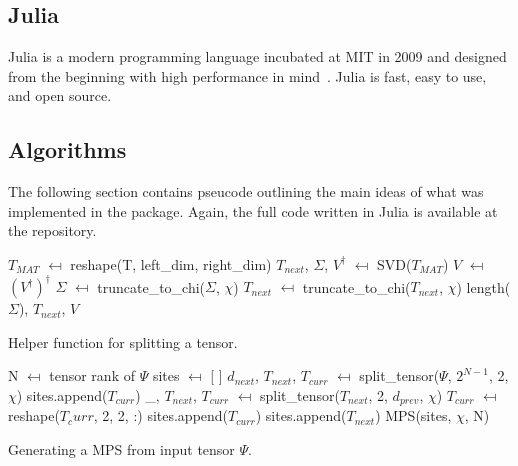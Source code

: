 \documentclass[12pt]{article}
\begin{document}
\begin{multicols}{2}
	\subsection*{Julia}
	Julia is a modern programming language incubated at MIT in 2009 and
	designed from the beginning with high performance in mind~\cite{Julia-lang}.
	Julia is fast, easy to use, and open source.
	\subsection*{Algorithms}
	The following section contains pseucode outlining the main ideas
	of what was implemented in the package. Again, the full code written
	in Julia is available at the repository.
	\begin{algorithm}[H]
		$T_{MAT}$ $\mapsfrom$ reshape(T, left\_dim, right\_dim)\;
		$T_{next}$, $\Sigma$, $V^\dagger$ $\mapsfrom$ SVD($T_{MAT}$)\;
		$V$ $\mapsfrom$ $(V^\dagger)^\dagger$\;
		$\Sigma$ $\mapsfrom$ truncate\_to\_chi($\Sigma$, $\chi$)\;
		$T_{next}$ $\mapsfrom$ truncate\_to\_chi($T_{next}$, $\chi$)\;
		\Return length($\Sigma$), $T_{next}$, $V$\;
		\caption{Helper function for splitting a tensor.}
		\label{split-tensor}
	\end{algorithm}
	\vspace{20px}
	\begin{algorithm}[H]
		N $\mapsfrom$ tensor rank of $\Psi$\;
		sites $\mapsfrom$ [ ]\;
		$d_{next}$, $T_{next}$, $T_{curr}$ $\mapsfrom$ split\_tensor($\Psi$, $2^{N-1}$, 2, $\chi$)\;
		sites.append($T_{curr}$)\;
		\_, $T_{next}$, $T_{curr}$ $\mapsfrom$ split\_tensor($T_{next}$, 2, $d_{prev}$, $\chi$)\;
		$T_{curr}$ $\mapsfrom$ reshape($T_curr$, 2, 2, :)\;
		sites.append($T_{curr}$)\;
		sites.append($T_{next}$)\;
		\Return MPS(sites, $\chi$, N)\;
		\caption{Generating a MPS from input tensor $\Psi$.}
		\label{mps-gen}
	\end{algorithm}


\end{multicols}
\end{document}
